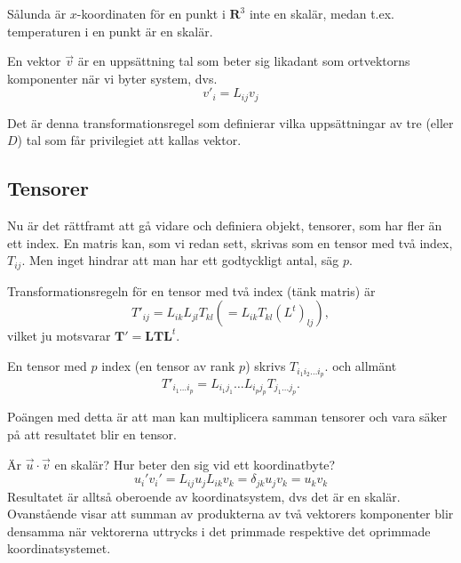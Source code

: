 \documentclass[%
oneside,                 %
final,                   %
10pt]{article}
\newenvironment{notice_mdfboxadmon}[1][]{
\begin{notice_mdfboxmdframed}[frametitle=#1]
}
{
\end{notice_mdfboxmdframed}
}
\newenvironment{warning_mdfboxadmon}[1][]{
\begin{warning_mdfboxmdframed}[frametitle=#1]
}
{
\end{warning_mdfboxmdframed}
}
\begin{document}
Sålunda är $x$-koordinaten för en punkt i $\mathbf{R}^3$ inte en skalär, medan t.ex. temperaturen i en punkt är en skalär. 

En vektor $\vec v$ är en uppsättning tal som beter sig likadant som ortvektorns komponenter när vi byter system, dvs.
\begin{equation}
v'_i=L_{ij}v_j
\end{equation}

\begin{warning_mdfboxadmon}[Kommentar]
Det är denna transformationsregel som definierar vilka uppsättningar av tre (eller $D$) tal som får privilegiet att kallas vektor.
\end{warning_mdfboxadmon} %



\subsection*{Tensorer}

\begin{warning_mdfboxadmon}[Kommentar]
Nu är det rättframt att gå vidare och definiera objekt,  tensorer, som har fler än ett index. En matris kan, som vi redan sett, skrivas som en tensor med två index, $T_{ij}$. Men inget hindrar att man har ett godtyckligt antal, säg $p$.
\end{warning_mdfboxadmon} %



Transformationsregeln för en tensor med två index (tänk matris) är
\begin{equation} 
T'_{ij} = L_{ik} L_{jl} T_{kl} \left( = L_{ik} T_{kl} \left( L^t \right)_{lj} \right),
\end{equation}
vilket ju motsvarar $\mathbf{T}' = \mathbf{L} \mathbf{T} \mathbf{L}^t$.

En tensor med $p$ index (en tensor av rank $p$) skrivs $T_{i_1i_2\ldots i_p}$.  och allmänt
\begin{equation}
T'_{i_1\ldots i_p}=L_{i_1j_1}\ldots L_{i_pj_p}T_{j_1\ldots j_p}.
\end{equation}

Poängen med detta är att man kan multiplicera samman tensorer och
vara säker på att resultatet blir en tensor. 


\begin{notice_mdfboxadmon}[Skalärprodukt]
Är $\vec{u} \cdot \vec{v}$ en skalär? Hur beter den sig vid ett koordinatbyte?
\begin{equation}
u_i' v_i' = L_{ij} u_j L_{ik} v_k = \delta_{jk} u_j v_k = u_k v_k
\end{equation}
Resultatet är alltså oberoende av koordinatsystem, dvs det är en skalär. Ovanstående visar att summan av produkterna av två vektorers komponenter blir densamma när vektorerna uttrycks i det primmade respektive det oprimmade koordinatsystemet.
\end{notice_mdfboxadmon} %
\end{document}
